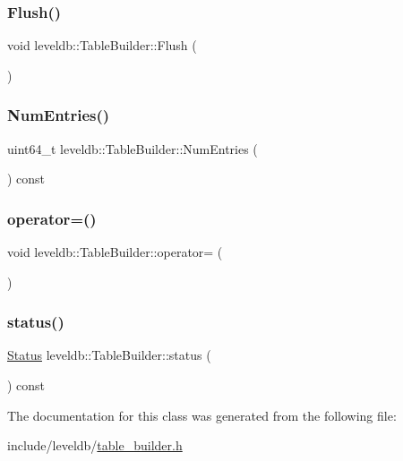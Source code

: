 \subsubsection{\texorpdfstring{Flush()}{Flush()}}
{\footnotesize\ttfamily void leveldb\+::\+Table\+Builder\+::\+Flush (\begin{DoxyParamCaption}{ }\end{DoxyParamCaption})}

\mbox{\label{classleveldb_1_1_table_builder_a1449306d91ce2edfd88625482ecd03d1}} 
\subsubsection{\texorpdfstring{NumEntries()}{NumEntries()}}
{\footnotesize\ttfamily uint64\+\_\+t leveldb\+::\+Table\+Builder\+::\+Num\+Entries (\begin{DoxyParamCaption}{ }\end{DoxyParamCaption}) const}

\mbox{\label{classleveldb_1_1_table_builder_acb2779b99c803170e72eb39f2e713181}} 
\subsubsection{\texorpdfstring{operator=()}{operator=()}}
{\footnotesize\ttfamily void leveldb\+::\+Table\+Builder\+::operator= (\begin{DoxyParamCaption}\item[{const \mbox{\hyperlink{classleveldb_1_1_table_builder}{Table\+Builder}} \&}]{ }\end{DoxyParamCaption})\hspace{0.3cm}{\ttfamily [delete]}}

\mbox{\label{classleveldb_1_1_table_builder_a9199d15b39f1b7ec83c49b58e8bd4768}} 
\subsubsection{\texorpdfstring{status()}{status()}}
{\footnotesize\ttfamily \mbox{\hyperlink{classleveldb_1_1_status}{Status}} leveldb\+::\+Table\+Builder\+::status (\begin{DoxyParamCaption}{ }\end{DoxyParamCaption}) const}



The documentation for this class was generated from the following file\+:\begin{DoxyCompactItemize}
\item 
include/leveldb/\mbox{\hyperlink{table__builder_8h}{table\+\_\+builder.\+h}}\end{DoxyCompactItemize}
